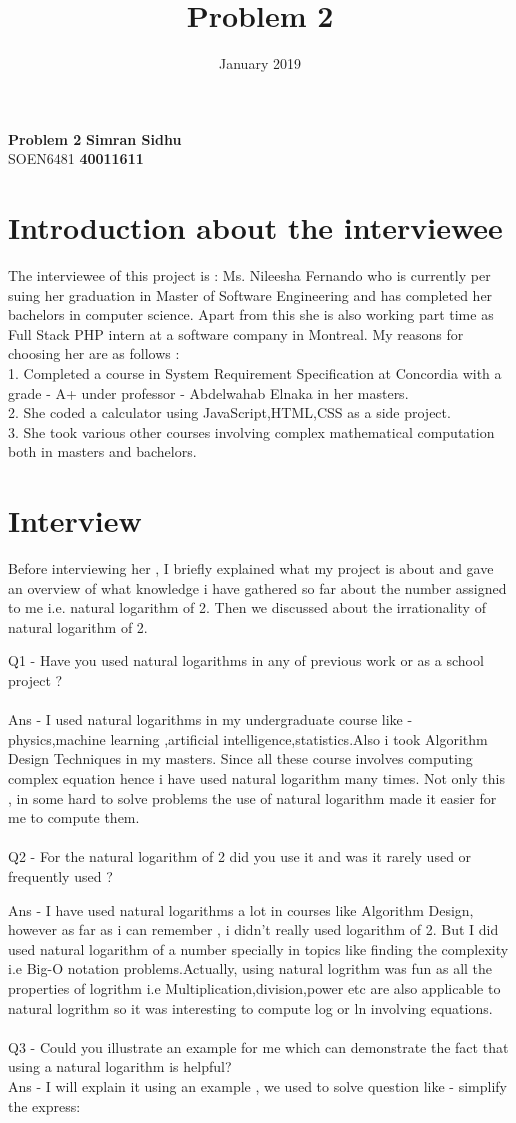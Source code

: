 \documentclass{article}
\title{Problem 2}
\date{January 2019}
\begin{document}
\noindent
\large\textbf{Problem 2} \hfill \textbf{Simran Sidhu} \\
\normalsize SOEN6481 \hfill \textbf{40011611} \\
\section{Introduction about the interviewee}
The interviewee of this project is : Ms. Nileesha Fernando who is currently per suing her graduation in Master of Software Engineering and has completed her bachelors in computer science. Apart from this she is also working part time as Full Stack PHP intern at a software company in Montreal.
My reasons for choosing her are as follows :\\
1. Completed a course in System Requirement Specification at Concordia with a grade - A+  under professor - Abdelwahab Elnaka in her masters.\\ 
2. She coded a calculator using JavaScript,HTML,CSS as a side project.\\
3. She took various other courses involving complex mathematical computation both in masters and bachelors.
\section{Interview}
Before interviewing her , I briefly explained what my project is about and gave an overview of what knowledge i have gathered so far about the number assigned to me i.e. natural logarithm of 2. Then we discussed about the irrationality of natural logarithm of 2. 

Q1 - Have you used natural logarithms in any of previous work or as a school project ? \\\\
Ans - I used natural logarithms in my undergraduate course like - physics,machine learning ,artificial intelligence,statistics.Also i took 
Algorithm Design Techniques in my masters. Since all these course involves computing complex equation hence i have used natural logarithm many times. Not only this , in some hard to solve problems the use of natural logarithm made it easier for me to compute them.\\
\\
Q2 - For the natural logarithm of 2  did you use it and was it rarely used or frequently used ?

Ans - I have used natural logarithms a lot in courses like Algorithm Design, however as far as i can remember , i didn't really used logarithm of 2. But  I did used natural logarithm of a number specially in topics like finding the complexity i.e  Big-O notation problems.Actually, using natural logrithm was fun as all the properties of logrithm i.e Multiplication,division,power etc are also applicable to natural logrithm so it was interesting to compute log or ln involving equations.\\
\\
Q3 - Could you illustrate an example for me which can demonstrate the fact that using a natural logarithm is helpful?\\
Ans - I will explain it using an example , we used to solve question like - 
simplify the express:\\
\end{document}
